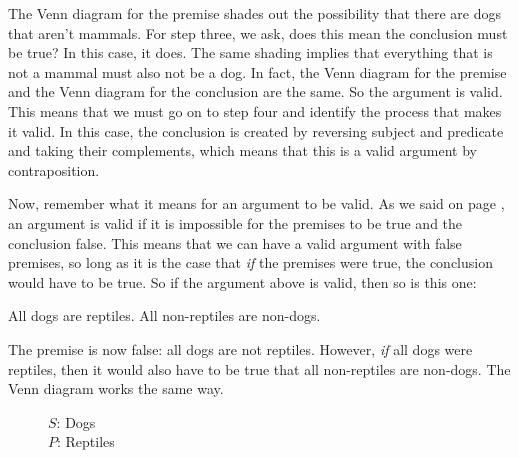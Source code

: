 The Venn diagram for the premise shades out the possibility that there are dogs that aren't mammals. For step three, we ask, does this mean the conclusion must be true?  In this case, it does. The same shading implies that everything that is not a mammal must also not be a dog. In fact, the Venn diagram for the premise and the Venn diagram for the conclusion are the same. So the argument is valid. This means that we must go on to step four and identify the process that makes it valid. In this case, the conclusion is created by reversing subject and predicate and taking their complements, which means that this is a valid argument by contraposition.

Now, remember what it means for an argument to be valid. \label{valid_definition_reinforcement} As we said on page \pageref{def:valid}, an argument is valid if it is impossible for the premises to be true and the conclusion false. This means that we can have a valid argument with false premises, so long as it is the case that \emph{if} the premises were true, the conclusion would have to be true. So if the argument above is valid, then so is this one:

\begin{earg*}
\item All dogs are reptiles.
\itemc[.3] All non-reptiles are non-dogs.
\end{earg*}

The premise is now false: all dogs are not reptiles. However, \emph{if} all dogs were reptiles, then it would also have to be true that all non-reptiles are non-dogs. The Venn diagram works the same way.

\begin{figure}[H]
\begin{center}
\end{center}
\captionsetup{singlelinecheck=on}
\caption*{$S$: Dogs \\ $P$: Reptiles}
\end{figure}

